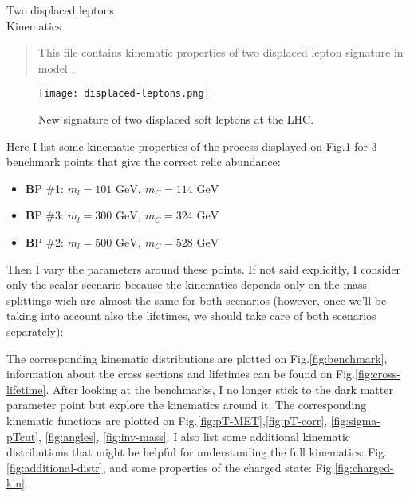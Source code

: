 \documentclass[10pt,letterpaper,notitlepage]{article}
\begin{document}
\begin{center}
\LARGE Two displaced leptons\\
\Large Kinematics
\end{center}

\vspace{1.0cm}
\begin{abstract}
\vspace{0.2cm}\noindent
This file contains kinematic properties of two displaced lepton signature in model \cite{Filimonova:2018qdc}.
\end{abstract}


\begin{figure}[H]
\centering
\texttt{[image: displaced-leptons.png]}
\caption{\label{fig:2displaced_diagram}New signature of two displaced soft leptons at the LHC.}
\end{figure}


Here I list some kinematic properties of the process displayed on Fig.\ref{fig:2displaced_diagram} for 3 benchmark points that give the correct relic abundance:

\begin{itemize}
  \item {\textbf BP \#1}: $m_l = 101 \text{ GeV},\ m_C = 114\text{ GeV}$
  \item {\textbf BP \#3}: $m_l = 300 \text{ GeV},\ m_C = 324 \text{ GeV}$
  \item {\textbf BP \#2}: $m_l = 500 \text{ GeV},\ m_C = 528 \text{ GeV}$
\end{itemize} \label{benchmarks_scalar}

 Then I vary the parameters around these points. If not said explicitly, I consider only the scalar scenario because the kinematics depends only on the mass splittings wich are almost the same for both scenarios (however, once we'll be taking into account also the lifetimes, we should take care of both scenarios separately):


The corresponding kinematic distributions are plotted on Fig.\ref{fig:benchmark}, information about the cross sections and lifetimes can be found on Fig.\ref{fig:cross-lifetime}. After looking at the benchmarks, I no longer stick to the dark matter parameter point but explore the kinematics around it. The corresponding kinematic functions are plotted on Fig.\ref{fig:pT-MET},\ref{fig:pT-corr}, \ref{fig:sigma-pTcut}, \ref{fig:angles}, \ref{fig:inv-mass}. I also list some additional kinematic distributions that might be helpful for understanding the full kinematics: Fig.\ref{fig:additional-distr},  and some properties of the charged state: Fig.\ref{fig:charged-kin}.
\end{document}
